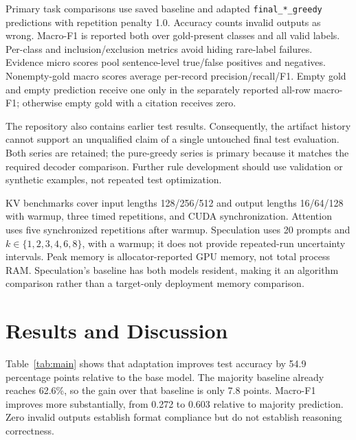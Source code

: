 \documentclass[conference]{IEEEtran}
\begin{document}
Primary task comparisons use saved baseline and adapted \texttt{final\_*\_greedy} predictions with repetition penalty 1.0. Accuracy counts invalid outputs as wrong. Macro-F1 is reported both over gold-present classes and all valid labels. Per-class and inclusion/exclusion metrics avoid hiding rare-label failures. Evidence micro scores pool sentence-level true/false positives and negatives. Nonempty-gold macro scores average per-record precision/recall/F1. Empty gold and empty prediction receive one only in the separately reported all-row macro-F1; otherwise empty gold with a citation receives zero.

The repository also contains earlier test results. Consequently, the artifact history cannot support an unqualified claim of a single untouched final test evaluation. Both series are retained; the pure-greedy series is primary because it matches the required decoder comparison. Further rule development should use validation or synthetic examples, not repeated test optimization.

KV benchmarks cover input lengths 128/256/512 and output lengths 16/64/128 with warmup, three timed repetitions, and CUDA synchronization. Attention uses five synchronized repetitions after warmup. Speculation uses 20 prompts and $k\in\{1,2,3,4,6,8\}$, with a warmup; it does not provide repeated-run uncertainty intervals. Peak memory is allocator-reported GPU memory, not total process RAM. Speculation's baseline has both models resident, making it an algorithm comparison rather than a target-only deployment memory comparison.

\section{Results and Discussion}
\begin{table}[t]\centering
\caption{Saved raw-model results. The first three numeric columns are validation; the last three are test. Maj. is the training-derived majority baseline.}
\label{tab:main}\end{table}
Table~\ref{tab:main} shows that adaptation improves test accuracy by 54.9 percentage points relative to the base model. The majority baseline already reaches 62.6\%, so the gain over that baseline is only 7.8 points. Macro-F1 improves more substantially, from 0.272 to 0.603 relative to majority prediction. Zero invalid outputs establish format compliance but do not establish reasoning correctness.
\end{document}
